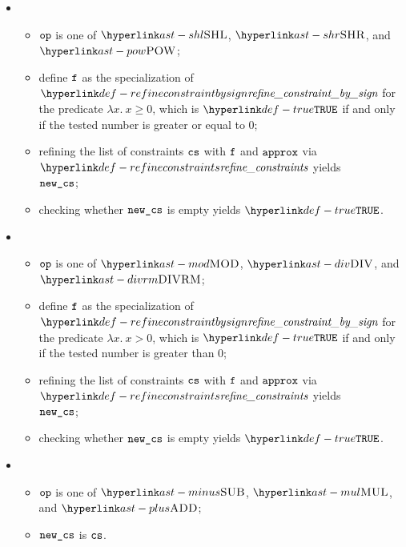 \ProseParagraph
\OneApplies
\begin{itemize}
  \item {}
  \begin{itemize}
    \item $\op$ is one of $\SHL$, $\SHR$, and $\POW$;
    \item define $\vf$ as the specialization of $\refineconstraintbysign$ for the predicate
          $\lambda x.\ x \geq 0$, which is $\True$ if and only if the tested number is greater or equal to $0$;
    \item refining the list of constraints $\cs$ with $\vf$ and $\vapprox$ via $\refineconstraints$ yields \\
          $\newcs$\ProseTerminateAs{\CannotUnderapproximate, \CannotOverapproximate};
    \item checking whether $\newcs$ is empty yields $\True$\ProseTerminateAs{\BadOperands}.
  \end{itemize}

  \item {}
  \begin{itemize}
    \item $\op$ is one of $\MOD$, $\DIV$, and $\DIVRM$;
    \item define $\vf$ as the specialization of $\refineconstraintbysign$ for the predicate
          $\lambda x.\ x > 0$, which is $\True$ if and only if the tested number is greater than $0$;
    \item refining the list of constraints $\cs$ with $\vf$ and $\vapprox$ via $\refineconstraints$ yields \\
          $\newcs$\ProseTerminateAs{\CannotUnderapproximate, \CannotOverapproximate};
    \item checking whether $\newcs$ is empty yields $\True$\ProseTerminateAs{\BadOperands}.
  \end{itemize}

  \item {}
  \begin{itemize}
    \item $\op$ is one of $\MINUS$, $\MUL$, and $\PLUS$;
    \item $\newcs$ is $\cs$.
  \end{itemize}
\end{itemize}

\FormallyParagraph
\begin{mathpar}
\end{mathpar}

